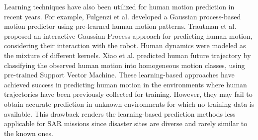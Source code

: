 \documentclass[journal]{IEEEtran}
\newcommand{\todohere}[1]{\hl{(\textbf{TODO:} #1)}}
\begin{document}
	Learning techniques have also been utilized for human motion prediction in recent years. 
	For example, Fulgenzi et al. \cite{fulgenzi2008probabilistic} developed a Gaussian process-based motion predictor using pre-learned human motion patterns.
    Trautman et al. \cite{trautman2015robot} proposed an interactive Gaussian Process approach for predicting human motion, considering their interaction with the robot. Human dynamics were modeled as the mixture of different kernels.
    Xiao et al. \cite{xiao2015unsupervised} predicted human future trajectory by classifying the observed human motion into homogeneous motion classes, using pre-trained Support Vector Machine.
	These learning-based approaches have achieved success in predicting human motion in the environments where human trajectories have been previously collected for training.
	However, they may fail to obtain accurate prediction in unknown environments for which no training data is available.
	This drawback renders the learning-based prediction methods less applicable for SAR missions since disaster sites are diverse and rarely similar to the known ones.
	
\end{document}
